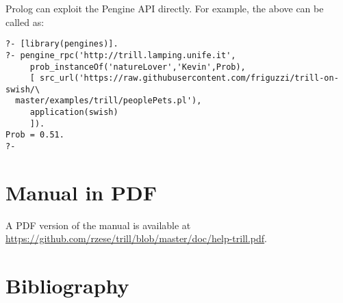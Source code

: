 \documentclass[a4paper,10pt]{scrartcl}
\begin{document}
Prolog can exploit the Pengine API directly.  For example, the above can
be called as:
\begin{verbatim}
?- [library(pengines)].
?- pengine_rpc('http://trill.lamping.unife.it',
     prob_instanceOf('natureLover','Kevin',Prob),
     [ src_url('https://raw.githubusercontent.com/friguzzi/trill-on-swish/\
  master/examples/trill/peoplePets.pl'),
     application(swish)
     ]).
Prob = 0.51.
?-
\end{verbatim}

\section{Manual in PDF}
A PDF version of the manual is available at
\url{https://github.com/rzese/trill/blob/master/doc/help-trill.pdf}.
\section{Bibliography}


\end{document}
